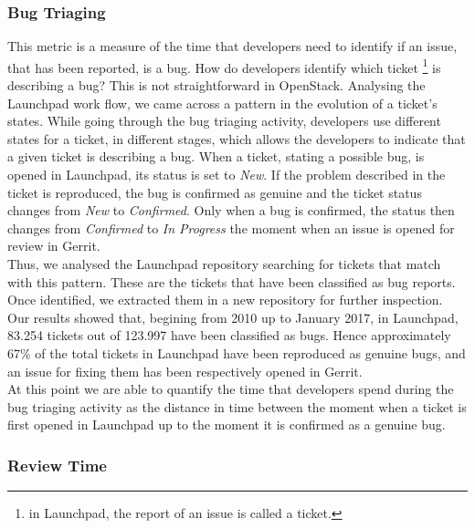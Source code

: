 \documentclass[10pt, conference]{IEEEtran}
\begin{document}
\subsubsection{Bug Triaging}

This metric is a measure of the time that developers need to
identify if an issue, that has been reported, 
is a bug. How do developers 
identify which ticket \footnote{in Launchpad, the report of an issue is called a ticket.} is describing a bug?
This is not straightforward in OpenStack. Analysing
the Launchpad work flow, we came across a pattern in the
evolution of a ticket's states. While going through the bug triaging activity, 
developers use different states for a ticket, 
in different stages, which allows the developers to indicate that a given ticket 
is describing a bug.
When a ticket, stating a possible bug, is opened in
Launchpad, its status is set to \emph{New}.
If the problem described in the ticket is reproduced,
the bug is confirmed as genuine and the ticket status
changes from \emph{New} to \emph{Confirmed}.
Only when a bug is confirmed, the status then changes
from \emph{Confirmed} to \emph{In Progress} the moment when an
issue is opened for review in Gerrit.
\\
Thus, we analysed the Launchpad repository searching for
tickets that match with this pattern. These are the tickets
that have been classified as bug reports. 
\\Once identified, we extracted them in a new repository for further inspection.
Our results showed that, begining from 2010 up to January
2017, in Launchpad, 83.254 tickets out of 123.997 have been
classified as bugs. Hence approximately 67\% of the total
tickets in Launchpad have been reproduced as genuine
bugs, and an issue for fixing them has been respectively opened in Gerrit.
\\
At this point we are able to quantify the time that developers spend during the 
bug triaging activity as the distance in
time between the moment when a ticket is first opened in
Launchpad up to the moment it is confirmed as a genuine
bug.
\\
\subsubsection{Review Time}
\end{document}
